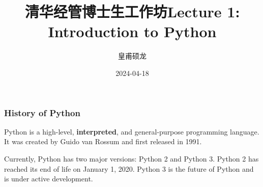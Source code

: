 \documentclass[beamer, en, version=2.0]{huangfusl-template}
\title[Lecture 1: Introduction to Python]{\LARGE{清华经管博士生工作坊}\newline\newline \large{Lecture 1: Introduction to Python}}
\author{皇甫硕龙}
\date{2024-04-18}
\begin{document}
    \begin{frame}[fragile]
        \maketitle
    \end{frame}
    \begin{frame}
        \frametitle{History of Python}

        Python is a high-level, \textbf{interpreted}, and general-purpose programming language. It was created by Guido van Rossum and first released in 1991.

        Currently, Python has two major versions: Python 2 and Python 3. Python 2 has reached its end of life on January 1, 2020. Python 3 is the future of Python and is under active development.
    \end{frame}
\end{document}
